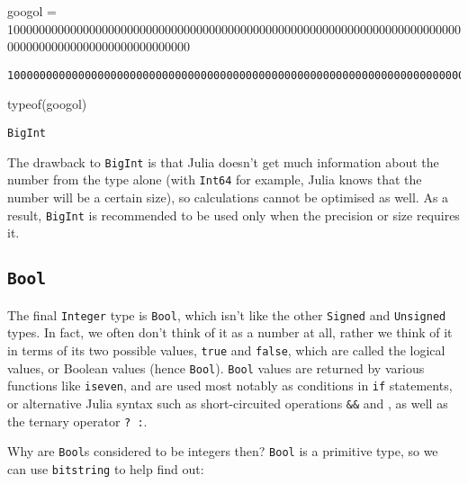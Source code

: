\documentclass[
  letterpaper,
  DIV=11,
  numbers=noendperiod]{scrreprt}
\newenvironment{Shaded}{\begin{snugshade}}{\end{snugshade}}
\newcommand{\FloatTok}[1]{\textcolor[rgb]{0.68,0.00,0.00}{#1}}
\newcommand{\FunctionTok}[1]{\textcolor[rgb]{0.28,0.35,0.67}{#1}}
\newcommand{\NormalTok}[1]{\textcolor[rgb]{0.00,0.23,0.31}{#1}}
\newcommand{\OperatorTok}[1]{\textcolor[rgb]{0.37,0.37,0.37}{#1}}
\begin{document}
\begin{Shaded}
\begin{Highlighting}[]
\NormalTok{googol }\OperatorTok{=} \FloatTok{10000000000000000000000000000000000000000000000000000000000000000000000000000000000000000000000000000}
\end{Highlighting}
\end{Shaded}

\begin{verbatim}
10000000000000000000000000000000000000000000000000000000000000000000000000000000000000000000000000000
\end{verbatim}

\begin{Shaded}
\begin{Highlighting}[]
\FunctionTok{typeof}\NormalTok{(googol)}
\end{Highlighting}
\end{Shaded}

\begin{verbatim}
BigInt
\end{verbatim}

The drawback to \texttt{BigInt} is that Julia doesn't get much
information about the number from the type alone (with \texttt{Int64}
for example, Julia knows that the number will be a certain size), so
calculations cannot be optimised as well. As a result, \texttt{BigInt}
is recommended to be used only when the precision or size requires it.

\hypertarget{bool}{%
\subsection{\texorpdfstring{\texttt{Bool}}{Bool}}\label{bool}}

The final \texttt{Integer} type is \texttt{Bool}, which isn't like the
other \texttt{Signed} and \texttt{Unsigned} types. In fact, we often
don't think of it as a number at all, rather we think of it in terms of
its two possible values, \texttt{true} and \texttt{false}, which are
called the logical values, or Boolean values (hence \texttt{Bool}).
\texttt{Bool} values are returned by various functions like
\texttt{iseven}, and are used most notably as conditions in \texttt{if}
statements, or alternative Julia syntax such as short-circuited
operations \texttt{\&\&} and \texttt{\textbar{}\textbar{}}, as well as
the ternary operator \texttt{?\ :}.

Why are \texttt{Bool}s considered to be integers then? \texttt{Bool} is
a primitive type, so we can use \texttt{bitstring} to help find out:
\end{document}
